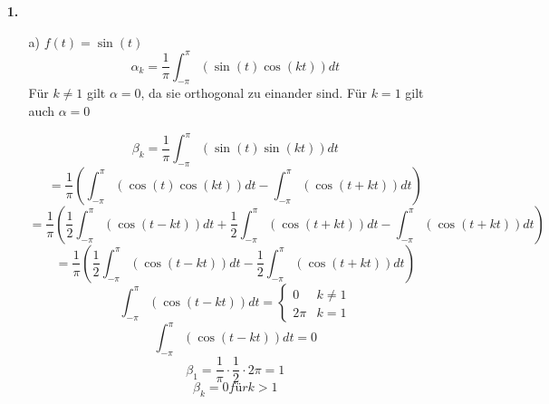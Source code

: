 \documentclass [a4paper,11pt]{article}
\author{\authorinfotitle}
\title{\titleinfo}
\date{\today}
\begin{document}
\maketitle
    \begin{enumerate}
        \item[\textbf{1.}]
            \begin{enumerate}
                \item[a)] $f(t) = \sin(t)$
              	$$\alpha_k = \frac{1}{\pi} \int_{-\pi}^{\pi}(\sin(t)\cos(kt))dt$$
              	Für $k\neq 1$ gilt $\alpha=0$, da sie orthogonal zu einander sind.
              	Für $k = 1$ gilt auch $\alpha=0$
              	
              	$$\beta_k = \frac{1}{\pi} \int_{-\pi}^{\pi}(\sin(t)\sin(kt))dt$$
              	$$  = \frac{1}{\pi} \left(  \int_{-\pi}^{\pi}(\cos(t)\cos(kt))dt-\int_{-\pi}^{\pi}(\cos(t+kt))dt\right) $$
              	$$  = \frac{1}{\pi} \left(  \frac{1}{2}\int_{-\pi}^{\pi}(\cos(t-kt))dt +\frac{1}{2}\int_{-\pi}^{\pi}(\cos(t+kt))dt -\int_{-\pi}^{\pi}(\cos(t+kt))dt\right) $$
              	$$  = \frac{1}{\pi} \left(  \frac{1}{2}\int_{-\pi}^{\pi}(\cos(t-kt))dt-\frac{1}{2}\int_{-\pi}^{\pi}(\cos(t+kt))dt\right) $$
              	$$\int_{-\pi}^{\pi}(\cos(t-kt))dt = 
              	\begin{cases}
					0 & k \neq 1\\
					2\pi & k = 1              	
              	\end{cases}$$
              	$$\int_{-\pi}^{\pi}(\cos(t-kt))dt = 0 $$
              	$$\beta_1 = \frac{1}{\pi} \cdot \frac{1}{2} \cdot 2\pi = 1$$
              	$$\beta_k = 0 für k > 1$$
            \end{enumerate}
    \end{enumerate}
\end{document}
